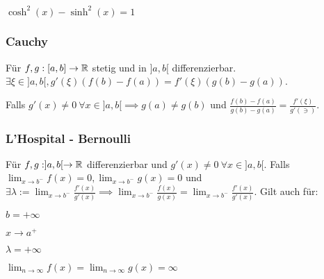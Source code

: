 \begin{compactenum}
\item $\cosh^2(x) - \sinh^2(x) = 1$
\end{compactenum}

\subsubsection{Cauchy}
Für $f, g: [a,b] \to \mathbb{R}$ stetig und in $]a,b[$ differenzierbar. $\exists \xi \in ]a,b[, g'(\xi)(f(b) - f(a)) = f'(\xi)(g(b)-g(a))$.
\begin{compactitem}
\item Falls $g'(x) \neq 0 \ \forall x \in ]a,b[ \implies g(a) \neq g(b)$ und $\frac{f(b) - f(a)}{g(b) - g(a)} = \frac{f'(\xi)}{g'(\ni)}$.
\end{compactitem}

\subsubsection{L'Hospital - Bernoulli}
Für $f,g: ]a,b[ \to \mathbb{R}$ differenzierbar und $g'(x) \neq 0 \ \forall x \in ]a,b[$. Falls $\lim_{x \to b^-} f(x) = 0, \lim_{x \to b^-} g(x) = 0$ und $\exists \lambda := \lim_{x \to b^-} \frac{f'(x)}{g'(x)} \implies \lim_{x \to b^-} \frac{f(x)}{g(x)} = \lim_{x \to b^-} \frac{f'(x)}{g'(x)}$.\newline
Gilt auch für:
\begin{inparaitem}
    \item $b= +\infty$
    \item $x \to a^+$
    \item $\lambda = +\infty$
    \item $\lim_{n \to \infty} f(x) = \lim_{n \to \infty} g(x) = \infty$
\end{inparaitem}

